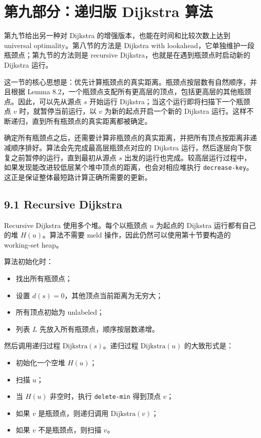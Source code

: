 \documentclass[UTF8]{ctexart}
\begin{document}
\section*{第九部分：递归版 Dijkstra 算法}

第九节给出另一种对 Dijkstra 的增强版本，也能在时间和比较次数上达到 universal optimality。第八节的方法是 Dijkstra with lookahead，它单独维护一段瓶颈点；第九节的方法则是 recursive Dijkstra，也就是在遇到瓶颈点时启动新的 Dijkstra 运行。

这一节的核心思想是：优先计算瓶颈点的真实距离。瓶颈点按层数有自然顺序，并且根据 Lemma 8.2，一个瓶颈点支配所有更高层的顶点，包括更高层的其他瓶颈点。因此，可以先从源点 \(s\) 开始运行 Dijkstra；当这个运行即将扫描下一个瓶颈点 \(v\) 时，就暂停当前运行，以 \(v\) 为新的起点开启一个新的 Dijkstra 运行。这样不断递归，直到所有瓶颈点的真实距离都被确定。

确定所有瓶颈点之后，还需要计算非瓶颈点的真实距离，并把所有顶点按距离非递减顺序排好。算法会先完成最高层瓶颈点对应的 Dijkstra 运行，然后逐层向下恢复之前暂停的运行，直到最初从源点 \(s\) 出发的运行也完成。较高层运行过程中，如果发现能改进较低层某个堆中顶点的距离，也会对相应堆执行 \texttt{decrease-key}。这正是保证整体最短路计算正确所需要的更新。

\subsection*{9.1 Recursive Dijkstra}

Recursive Dijkstra 使用多个堆。每个以瓶颈点 \(u\) 为起点的 Dijkstra 运行都有自己的堆 \(H(u)\)。算法不需要 meld 操作，因此仍然可以使用第十节要构造的 working-set heap。

算法初始化时：

\begin{itemize}
  \item 找出所有瓶颈点；
  \item 设置 \(d(s)=0\)，其他顶点当前距离为无穷大；
  \item 所有顶点初始为 unlabeled；
  \item 列表 \(L\) 先放入所有瓶颈点，顺序按层数递增。
\end{itemize}

然后调用递归过程 \(\text{Dijkstra}(s)\)。递归过程 \(\text{Dijkstra}(u)\) 的大致形式是：

\begin{itemize}
  \item 初始化一个空堆 \(H(u)\)；
  \item 扫描 \(u\)；
  \item 当 \(H(u)\) 非空时，执行 \texttt{delete-min} 得到顶点 \(v\)；
  \item 如果 \(v\) 是瓶颈点，则递归调用 \(\text{Dijkstra}(v)\)；
  \item 如果 \(v\) 不是瓶颈点，则扫描 \(v\)。
\end{itemize}
\end{document}

